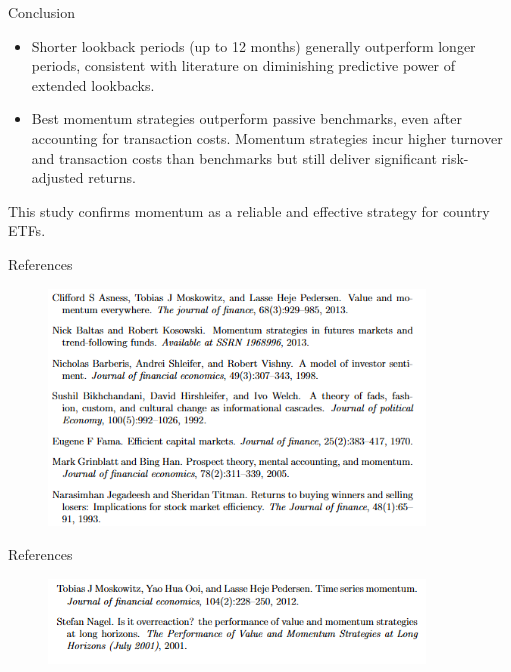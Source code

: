 \documentclass{beamer}
\newcommand{\myitem}{\item[\triangleright]}
\begin{document}
\begin{frame}[t]{Conclusion}
    \begin{itemize}
        \myitem Shorter lookback periods (up to 12 months) generally outperform longer periods, consistent with literature on diminishing predictive power of extended lookbacks.
        \myitem Best momentum strategies outperform passive benchmarks, even after accounting for transaction costs. Momentum strategies incur higher turnover and transaction costs than benchmarks but still deliver significant risk-adjusted returns.
    \end{itemize}

    This study confirms momentum as a reliable and effective strategy for country ETFs.
\end{frame}

\begin{frame}[t]{References}
    \begin{figure}[t!]\centering
    \includegraphics[width=10cm]{figures/ref1.PNG}
    \centering
    \label{ref1}
    \end{figure}
    
\end{frame}

\begin{frame}[t]{References}
    \begin{figure}[t!]\centering
    \includegraphics[width=10cm]{figures/ref2.PNG}
    \centering
    \label{ref2}
    \end{figure}
    
\end{frame}
\end{document}
